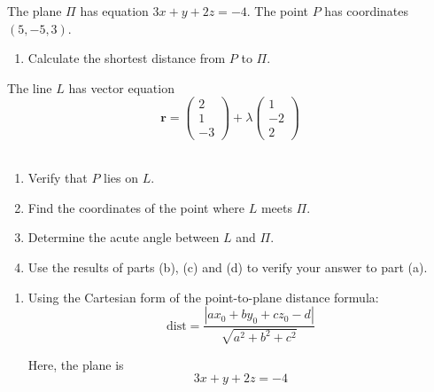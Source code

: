 \documentclass[leqno]{article}
\begin{document}
\djsFrontMatter
\begin{enumerate}[
  label=\textbf{\arabic*.},
  leftmargin=*,
  topsep=0pt,
  partopsep=0pt,
  parsep=0pt
]

\questionitem

The plane $\Pi$ has equation $3x+y+2z=-4$. The point $P$ has coordinates $(5,-5,3)$. \\
\begin{enumerate}[label=\textbf{(\alph*)}]
  \item Calculate the shortest distance from $P$ to $\Pi$.  \\
\end{enumerate}
The line $L$ has vector equation
\[
\mathbf{r}=\begin{pmatrix}2\\1\\-3\end{pmatrix}+\lambda\begin{pmatrix}1\\-2\\2\end{pmatrix}
\] \\
\begin{enumerate}[label=\textbf{(\alph*)}, resume]
  \item Verify that $P$ lies on $L$.  \\
  \item Find the coordinates of the point where $L$ meets $\Pi$.  \\
  \item Determine the acute angle between $L$ and $\Pi$.  \\
  \item Use the results of parts (b), (c) and (d) to verify your answer to part (a).  \\
\end{enumerate}

\vspace*{10pt}

\begin{djsSolution}
\begin{enumerate}[label=\textbf{(\alph*)}]
  \item Using the Cartesian form of the point-to-plane distance formula:
\[
\mathrm{dist}
=\frac{\left\lvert ax_0+by_0+cz_0-d\right\rvert}{\sqrt{a^2+b^2+c^2}}
\]

Here, the plane is
\[
3x+y+2z=-4
\]


\end{enumerate}
\end{djsSolution}
\end{enumerate}
\end{document}
